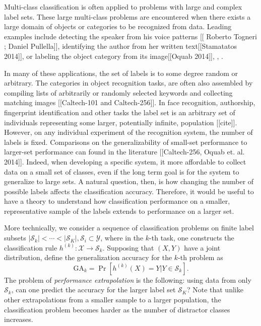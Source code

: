 \documentclass[twoside,11pt]{article}
\begin{document}
Multi-class classification is often applied to problems with large and complex label sets.
These large multi-class problems are encountered when there exists a large domain of objects or categories to be recognized from data.
Leading examples include detecting the speaker from his voice patterns [[ Roberto Togneri ;  Daniel Pullella]], 
identifying the author from her written text[[Stamatatos 2014]], or labeling the object 
category from its image[[Oquab 2014]], \cite{duygulu2002object}, \cite{deng2010does}. 

In many of these applications, the set of labels is to some degree random or arbitrary.
The categories in object recognition tasks, are often also assembled by compiling lists of arbitrarily or randomly selected keywords and collecting matching images [[Caltech-101 and Caltech-256]].
In face recognition, authorship, fingerprint identification and other tasks the label set 
is an arbitrary set of individuals representing some larger, potentially infinite, population [[cite]].
However, on any individual experiment of the recognition system, the number of labels is fixed.
Comparisons on the generalizability of small-set performance to larger-set performance can found in the literature [[Caltech-256, Oquab et. al. 2014]]. Indeed, when developing a specific system, it more affordable to collect data on a small set of classes, even if the long term goal is for the system to generalize to large sets. 
A natural question, then, is how changing the number of  possible labels affects the classification accuracy.
Therefore, it would be useful to have a theory to understand how classification performance on a smaller, representative sample of the labels extends to performance on a larger set.

More technically, we consider a sequence of classification
problems on finite label subsets
$|\mathcal{S}_k| < \cdots < |\mathcal{S}_K|, \mathcal{S}_i \subset \mathcal{Y}$,
where in the $k$-th task, one constructs the classification rule
$h^{(k)}:\mathcal{X} \to \mathcal{S}_k$.  Supposing that $(X, Y)$ have
a joint distribution, define the generalization accuracy for the
$k$-th problem as
\begin{equation}\label{eq:ga_k}
\text{GA}_k = \Pr[h^{(k)}(X) = Y|Y \in \mathcal{S}_k].
\end{equation}
The problem of \emph{performance extrapolation} is the following: using data
from only $\mathcal{S}_k$, can one predict the accuracy 
 for the larger label set $\mathcal{S}_K$?
Note that unlike other extrapolations from a smaller sample to a larger population, 
the classification problem becomes harder as the number of distractor classes
increases. 
\end{document}
